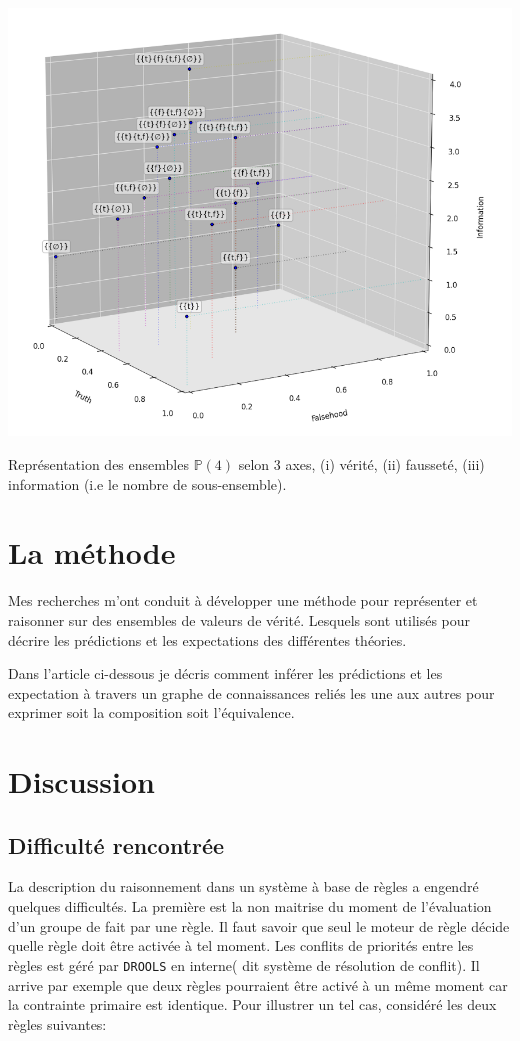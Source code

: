 \begin{refsegment}
\begin{shadedfigure}[H]
    \centering
    \includegraphics[width=\textwidth]{img/set_3d.png}
    \caption{Représentation des ensembles  $\mathbb{P}(4)$ selon 3 axes, (i) vérité, (ii) fausseté, (iii) information (i.e le nombre de sous-ensemble).}
    \label{fig:set3d}
\end{shadedfigure}

\section{La méthode}\label{sec:methode}

Mes recherches m'ont conduit à développer une méthode pour représenter et raisonner sur des ensembles de valeurs de vérité. Lesquels sont utilisés pour décrire les prédictions et les expectations des différentes théories.

Dans l'article ci-dessous je décris comment inférer les prédictions et les expectation à travers un graphe de connaissances reliés les une aux autres pour exprimer soit la composition soit l'équivalence.




\section{Discussion}
\subsection{Difficulté rencontrée}
La description du raisonnement dans un système à base de règles a engendré quelques difficultés. La première est la non maitrise du moment de l'évaluation d'un groupe de fait par une règle. Il faut savoir que seul le moteur de règle décide quelle règle doit être activée à tel moment. Les conflits de priorités entre les règles est géré par \texttt{DROOLS} en interne( dit système de résolution de conflit). Il arrive par exemple que deux règles pourraient être activé à un même moment car la contrainte primaire est identique. Pour illustrer un tel cas, considéré les deux règles suivantes:


\end{refsegment}

